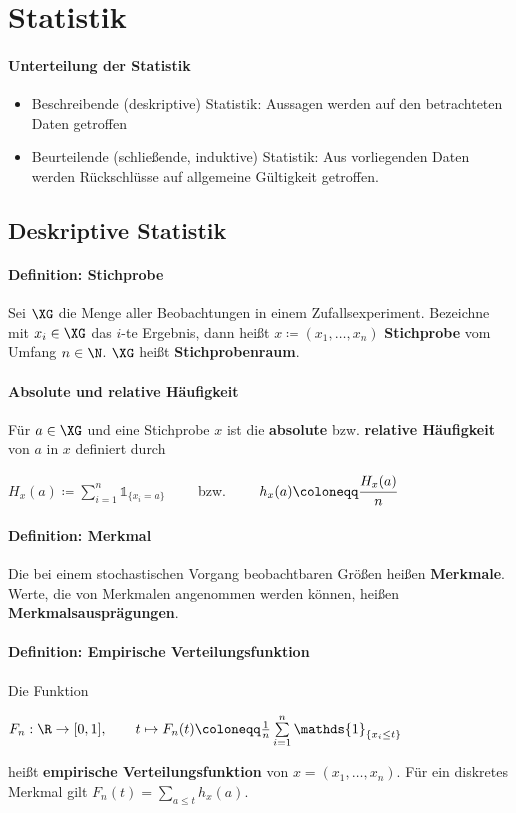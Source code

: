 \section{Statistik}
\paragraph{Unterteilung der Statistik}
\begin{itemize}
	\item Beschreibende (deskriptive) Statistik: Aussagen werden auf den betrachteten Daten getroffen
	\item Beurteilende (schließende, induktive) Statistik: Aus vorliegenden Daten werden Rückschlüsse auf allgemeine Gültigkeit getroffen.  
\end{itemize}

\subsection{Deskriptive Statistik}
\paragraph{Definition: Stichprobe}
Sei $\XG$ die Menge aller Beobachtungen in einem Zufallsexperiment.
Bezeichne mit $x_i\in\XG$ das $i$-te Ergebnis, dann heißt $x\coloneqq(x_1,\ldots,x_n)$ \textbf{Stichprobe} vom Umfang $n\in\N$.
$\XG$ heißt \textbf{Stichprobenraum}.

\paragraph{Absolute und relative Häufigkeit}
Für $a\in\XG$ und eine Stichprobe $x$ ist die \textbf{absolute} bzw. \textbf{relative Häufigkeit} von $a$ in $x$ definiert durch
\begin{tightcenter}
	$H_x(a)\coloneqq\sum\limits_{i=1}^{n}\mathds{1}_{\{x_i=a\}}\qquad$ bzw. $\qquad h_x(a)\coloneqq\cfrac{H_x(a)}{n}$
\end{tightcenter}

\paragraph{Definition: Merkmal}
Die bei einem stochastischen Vorgang beobachtbaren Größen heißen \textbf{Merkmale}.
Werte, die von Merkmalen angenommen werden können, heißen \textbf{Merkmalsausprägungen}.

\paragraph{Definition: Empirische Verteilungsfunktion}
Die Funktion
\begin{tightcenter}
	$F_n:\R\rightarrow[0,1], \qquad t\mapsto F_n(t)\coloneqq\frac{1}{n}\sum\limits_{i=1}^{n}\mathds{1}_{\{x_i\leq t\}}$
\end{tightcenter}
heißt \textbf{empirische Verteilungsfunktion} von $x=(x_1,\ldots,x_n)$.
Für ein diskretes Merkmal gilt $F_n(t)=\sum_{a\leq t}h_x(a)$.

